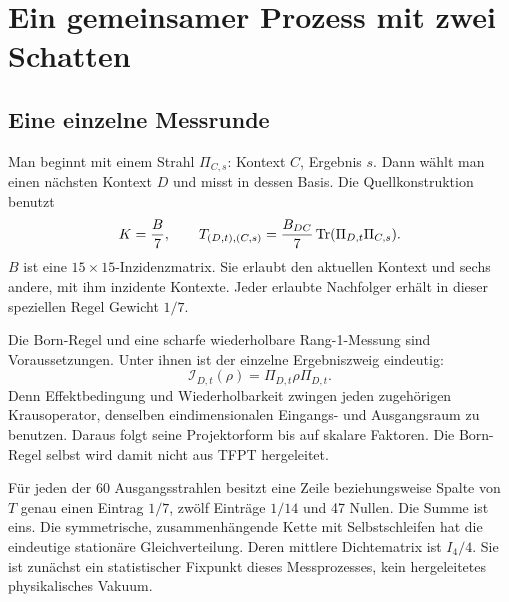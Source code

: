 \chapter{Ein gemeinsamer Prozess mit zwei Schatten}
\label{ch:prozess}
\section{Eine einzelne Messrunde}
Man beginnt mit einem Strahl $\Pi_{C,s}$: Kontext $C$, Ergebnis $s$. Dann wählt man einen nächsten Kontext $D$ und misst in dessen Basis. Die Quellkonstruktion benutzt
\begin{equation}
K=\frac B7,\qquad
T_{(D,t),(C,s)}=\frac{B_{DC}}7\operatorname{Tr}(\Pi_{D,t}\Pi_{C,s}).
\label{eq:T}
\end{equation}
$B$ ist eine $15\times15$-Inzidenzmatrix. Sie erlaubt den aktuellen Kontext und sechs andere, mit ihm inzidente Kontexte. Jeder erlaubte Nachfolger erhält in dieser speziellen Regel Gewicht $1/7$.

Die Born-Regel und eine scharfe wiederholbare Rang-1-Messung sind Voraussetzungen. Unter ihnen ist der einzelne Ergebniszweig eindeutig:
\begin{equation}
\mathcal I_{D,t}(\rho)=\Pi_{D,t}\rho\Pi_{D,t}.
\end{equation}
Denn Effektbedingung und Wiederholbarkeit zwingen jeden zugehörigen Krausoperator, denselben eindimensionalen Eingangs- und Ausgangsraum zu benutzen. Daraus folgt seine Projektorform bis auf skalare Faktoren. Die Born-Regel selbst wird damit nicht aus TFPT hergeleitet.

Für jeden der 60 Ausgangsstrahlen besitzt eine Zeile beziehungsweise Spalte von $T$ genau einen Eintrag $1/7$, zwölf Einträge $1/14$ und 47 Nullen. Die Summe ist eins. Die symmetrische, zusammenhängende Kette mit Selbstschleifen hat die eindeutige stationäre Gleichverteilung. Deren mittlere Dichtematrix ist $I_4/4$. Sie ist zunächst ein statistischer Fixpunkt dieses Messprozesses, kein hergeleitetes physikalisches Vakuum. 

